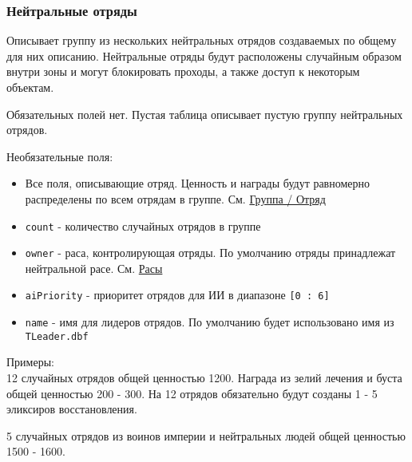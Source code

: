 \subsubsection{Нейтральные отряды}
\label{neutralStacks}
Описывает группу из нескольких нейтральных отрядов создаваемых по общему для них описанию.
Нейтральные отряды будут расположены случайным образом внутри зоны и могут блокировать проходы, а также доступ к некоторым объектам.

Обязательных полей нет. Пустая таблица описывает пустую группу нейтральных отрядов.

Необязательные поля:
\begin{itemize}
\item Все поля, описывающие отряд. Ценность и награды будут равномерно распределены по всем отрядам в группе. См. \hyperref[group]{Группа / Отряд}
\item \texttt{count} - количество случайных отрядов в группе
\item \texttt{owner} - раса, контролирующая отряды. По умолчанию отряды принадлежат нейтральной расе. См. \hyperref[raceTypes]{Расы}
\item \texttt{aiPriority} - приоритет отрядов для ИИ в диапазоне \texttt{[0 : 6]}
\item \texttt{name} - имя для лидеров отрядов. По умолчанию будет использовано имя из \texttt{TLeader.dbf}
\end{itemize}

Примеры:\\
12 случайных отрядов общей ценностью 1200.
Награда из зелий лечения и буста общей ценностью 200 - 300.
На 12 отрядов обязательно будут созданы  1 - 5 эликсиров восстановления.

\begin{figure}[H]

\end{figure}

5 случайных отрядов из воинов империи и нейтральных людей общей ценностью 1500 - 1600.

\begin{figure}[H]

\end{figure}